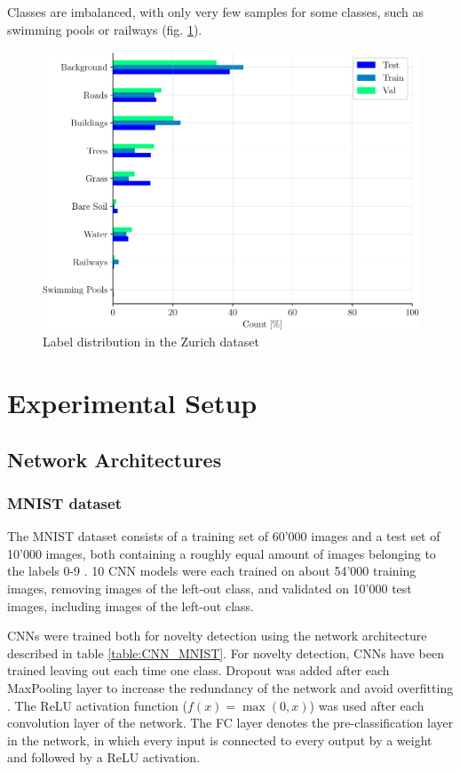 \documentclass[10pt]{article}
\begin{document}
Classes are imbalanced, with only very few samples for some classes, such as swimming pools or railways (fig. \ref{fig:zurich-label-dist}).

\begin{figure}[H]
    \centering
    \includegraphics[width=.7\textwidth]{ZH_dist}
    \caption{Label distribution in the Zurich dataset}
    \label{fig:zurich-label-dist}
\end{figure}


\section{Experimental Setup}
\label{sec:experimental-setup}
\subsection{Network Architectures}
\label{sec:network-architectures}
\subsubsection{MNIST dataset} 
The \gls{MNIST} dataset consists of a training set of 60'000 images and a test set of 10'000 images, both containing a roughly equal amount of images belonging to the labels 0-9 \cite{mnist}. 10 \gls{CNN} models were each trained on about 54'000 training images, removing images of the left-out class, and validated on 10'000 test images, including images of the left-out class.

\glspl{CNN} were trained both for novelty detection using the network architecture described in table \ref{table:CNN_MNIST}. For novelty detection, \glspl{CNN} have been trained leaving out each time one class. Dropout was added after each MaxPooling layer to increase the redundancy of the network and avoid overfitting \cite{Srivastava2014DropoutAS}. The \gls{ReLU} activation function ($f(x) = \max(0, x)$) was used after each convolution layer of the network.  The \gls{FC} layer denotes the pre-classification layer in the network, in which every input is connected to every output by a weight and followed by a \gls{ReLU} activation.
\end{document}
